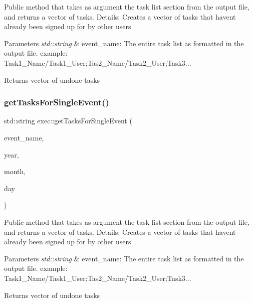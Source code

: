 Public method that takes as argument the task list section from the output file, and returns a vector of tasks. Details\+: Creates a vector of tasks that haven\textquotesingle{}t already been signed up for by other users 
\begin{DoxyParams}{Parameters}
{\em std\+::string} & event\+\_\+name\+: The entire task list as formatted in the output file. example\+: Task1\+\_\+\+Name/\+Task1\+\_\+\+User;Tas2\+\_\+\+Name/\+Task2\+\_\+\+User;Task3... \\
\hline
\end{DoxyParams}
\begin{DoxyReturn}{Returns}
vector of undone tasks 
\end{DoxyReturn}
\mbox{\label{classexec_a82e4d3616bf5ef3790b343de9f255548}} 
\subsubsection{\texorpdfstring{get\+Tasks\+For\+Single\+Event()}{getTasksForSingleEvent()}}
{\footnotesize\ttfamily std\+::string exec\+::get\+Tasks\+For\+Single\+Event (\begin{DoxyParamCaption}\item[{std\+::string}]{event\+\_\+name,  }\item[{std\+::string}]{year,  }\item[{std\+::string}]{month,  }\item[{std\+::string}]{day }\end{DoxyParamCaption})}

Public method that takes as argument the task list section from the output file, and returns a vector of tasks. Details\+: Creates a vector of tasks that haven\textquotesingle{}t already been signed up for by other users 
\begin{DoxyParams}{Parameters}
{\em std\+::string} & event\+\_\+name\+: The entire task list as formatted in the output file. example\+: Task1\+\_\+\+Name/\+Task1\+\_\+\+User;Tas2\+\_\+\+Name/\+Task2\+\_\+\+User;Task3... \\
\hline
\end{DoxyParams}
\begin{DoxyReturn}{Returns}
vector of undone tasks 
\end{DoxyReturn}
\mbox{\label{classexec_aa81946a7084e58b434cbbb3f41d646af}} 
